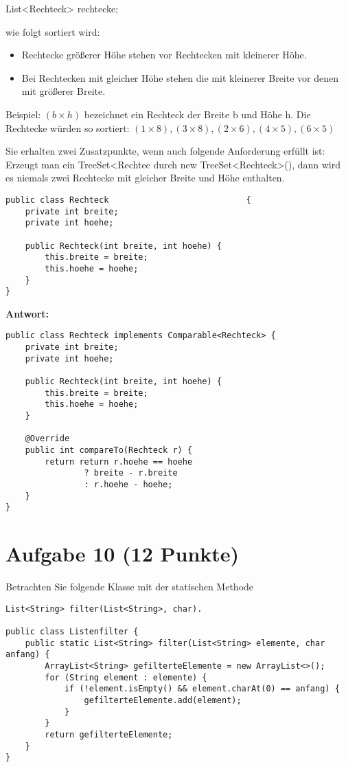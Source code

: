 List<Rechteck> rechtecke;

wie folgt sortiert wird:

\begin{itemize}
    \item Rechtecke größerer Höhe stehen vor Rechtecken mit kleinerer Höhe.
    \item Bei Rechtecken mit gleicher Höhe stehen die mit kleinerer Breite vor denen mit
          größerer Breite.
\end{itemize}

Beispiel: $(b \times h)$ bezeichnet ein Rechteck der Breite b und Höhe h. Die
Rechtecke würden so sortiert: $(1 \times 8), (3 \times 8), (2 \times 6), (4
    \times 5), (6 \times 5)$

Sie erhalten zwei Zusatzpunkte, wenn auch folgende Anforderung erfüllt ist:
Erzeugt man ein TreeSet<Rechtec durch new TreeSet<Rechteck>(), dann wird es
niemals zwei Rechtecke mit gleicher Breite und Höhe enthalten.

\begin{lstlisting}
public class Rechteck                            {
    private int breite;
    private int hoehe;

    public Rechteck(int breite, int hoehe) {
        this.breite = breite;
        this.hoehe = hoehe;
    }
}
\end{lstlisting}

\textbf{Antwort:}

\begin{lstlisting}
public class Rechteck implements Comparable<Rechteck> {
    private int breite;
    private int hoehe;

    public Rechteck(int breite, int hoehe) {
        this.breite = breite;
        this.hoehe = hoehe;
    }

    @Override
    public int compareTo(Rechteck r) {
        return return r.hoehe == hoehe 
                ? breite - r.breite
                : r.hoehe - hoehe;
    }
}
\end{lstlisting}

\section{Aufgabe 10 (12 Punkte)}

Betrachten Sie folgende Klasse mit der statischen Methode

\begin{lstlisting}
List<String> filter(List<String>, char).

public class Listenfilter {
    public static List<String> filter(List<String> elemente, char anfang) {
        ArrayList<String> gefilterteElemente = new ArrayList<>();
        for (String element : elemente) {
            if (!element.isEmpty() && element.charAt(0) == anfang) {
                gefilterteElemente.add(element);
            }
        }
        return gefilterteElemente;
    }
}
\end{lstlisting}


